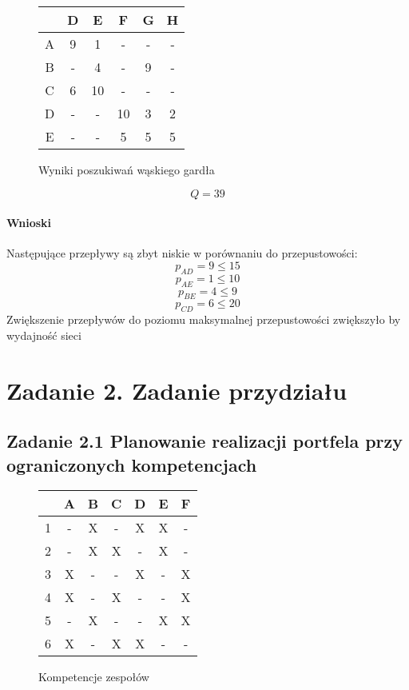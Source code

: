 \documentclass[12pt]{article}
\begin{document}
\begin{figure}[htb]
\caption{Wyniki poszukiwań wąskiego gardła}
\begin{center}
\begin{tabular}{ | c | c | c | c | c | c | }
\hline
  & D & E & F & G & H \\ 
 \hline
 A & 9 & 1 & - & - & -\\  
 \hline
 B & - & 4 & - & 9 & - \\
 \hline  
 C & 6 & 10 & - & - & - \\
 \hline  
 D & - & - & 10 & 3 & 2 \\
 \hline  
 E & - & - & 5 & 5 & 5 \\
 \hline  
\end{tabular}
\end{center}
\end{figure}

\[ Q = 39 \]



\paragraph{Wnioski}
Następujące przepływy są zbyt niskie w porównaniu do przepustowości:
\[ p_{AD} = 9 \le 15  \]
\[ p_{AE} = 1 \le 10  \]
\[ p_{BE} = 4 \le 9  \]
\[ p_{CD} = 6 \le 20  \]
Zwiększenie przepływów do poziomu maksymalnej przepustowości zwiększyło by wydajność sieci



\section{Zadanie 2. Zadanie przydziału}
\subsection{Zadanie 2.1 Planowanie realizacji portfela przy ograniczonych kompetencjach}
\begin{figure}[htb]
\caption{Kompetencje zespołów}
\begin{center}
\begin{tabular}{ | c | c | c | c | c | c | c | }
\hline
  & A & B & C & D & E & F \\ 
 \hline
 1 & - & X & - & X & X & - \\  
 \hline
 2 & - & X & X & - & X & - \\
 \hline  
 3 & X & - & - & X & - & X \\
 \hline  
 4 & X & - & X & - & - & X \\
 \hline  
 5 & - & X & - & - & X & X \\
 \hline  
 6 & X & - & X & X & - & - \\
 \hline
\end{tabular}
\end{center}
\end{figure}
\end{document}

